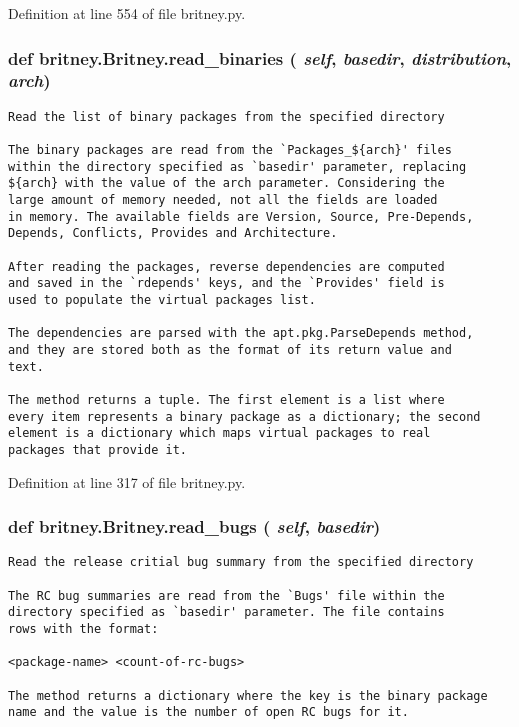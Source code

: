 Definition at line 554 of file britney.py.
\subsubsection{\setlength{\rightskip}{0pt plus 5cm}def britney.Britney.read\_\-binaries ( {\em self},  {\em basedir},  {\em distribution},  {\em arch})}\label{classbritney_1_1Britney_1b2b0f42e4af1cee472f93e955b30421}




\footnotesize\begin{verbatim}Read the list of binary packages from the specified directory

The binary packages are read from the `Packages_${arch}' files
within the directory specified as `basedir' parameter, replacing
${arch} with the value of the arch parameter. Considering the
large amount of memory needed, not all the fields are loaded
in memory. The available fields are Version, Source, Pre-Depends,
Depends, Conflicts, Provides and Architecture.

After reading the packages, reverse dependencies are computed
and saved in the `rdepends' keys, and the `Provides' field is
used to populate the virtual packages list.

The dependencies are parsed with the apt.pkg.ParseDepends method,
and they are stored both as the format of its return value and
text.

The method returns a tuple. The first element is a list where
every item represents a binary package as a dictionary; the second
element is a dictionary which maps virtual packages to real
packages that provide it.
\end{verbatim}
\normalsize
 

Definition at line 317 of file britney.py.
\subsubsection{\setlength{\rightskip}{0pt plus 5cm}def britney.Britney.read\_\-bugs ( {\em self},  {\em basedir})}\label{classbritney_1_1Britney_6c777aae69e7bec2efebaf23ddd4a86c}




\footnotesize\begin{verbatim}Read the release critial bug summary from the specified directory

The RC bug summaries are read from the `Bugs' file within the
directory specified as `basedir' parameter. The file contains
rows with the format:

<package-name> <count-of-rc-bugs>

The method returns a dictionary where the key is the binary package
name and the value is the number of open RC bugs for it.
\end{verbatim}
\normalsize
 

